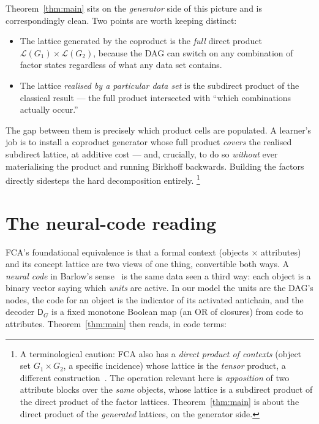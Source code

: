 \documentclass[11pt]{article}
\theoremstyle{definition}
\theoremstyle{plain}
\theoremstyle{remark}
\newcommand{\Dcode}{\mathsf{D}}            %
\newcommand{\Lgen}{\mathcal{L}}            %
\begin{document}
Theorem~\ref{thm:main} sits on the \emph{generator} side of this picture and is
correspondingly clean. Two points are worth keeping distinct:
\begin{itemize}
  \item The lattice generated by the coproduct is the \emph{full} direct product
        $\Lgen(G_1)\times\Lgen(G_2)$, because the DAG can switch on any
        combination of factor states regardless of what any data set contains.
  \item The lattice \emph{realised by a particular data set} is the subdirect
        product of the classical result --- the full product intersected with
        ``which combinations actually occur.''
\end{itemize}
The gap between them is precisely which product cells are populated. A learner's
job is to install a coproduct generator whose full product \emph{covers} the
realised subdirect lattice, at additive cost --- and, crucially, to do so
\emph{without} ever materialising the product and running Birkhoff backwards.
Building the factors directly sidesteps the hard decomposition entirely.%
\footnote{A terminological caution: FCA also has a \emph{direct product of
contexts} (object set $G_1\times G_2$, a specific incidence) whose lattice is the
\emph{tensor} product, a different construction~\cite{ganter1999}. The operation
relevant here is \emph{apposition} of two attribute blocks over the \emph{same}
objects, whose lattice is a subdirect product of the direct product of the factor
lattices. Theorem~\ref{thm:main} is about the direct product of the
\emph{generated} lattices, on the generator side.}

\section{The neural-code reading}
\label{sec:neural}

FCA's foundational equivalence is that a formal context (objects $\times$
attributes) and its concept lattice are two views of one thing, convertible both
ways. A \emph{neural code} in Barlow's sense~\cite{barlow1961,barlow1989} is the
same data seen a third way: each object is a binary vector saying which
\emph{units} are active. In our model the units are the DAG's nodes, the code for
an object is the indicator of its activated antichain, and the decoder
$\Dcode_G$ is a fixed monotone Boolean map (an OR of closures) from code to
attributes. Theorem~\ref{thm:main} then reads, in code terms:
\end{document}
